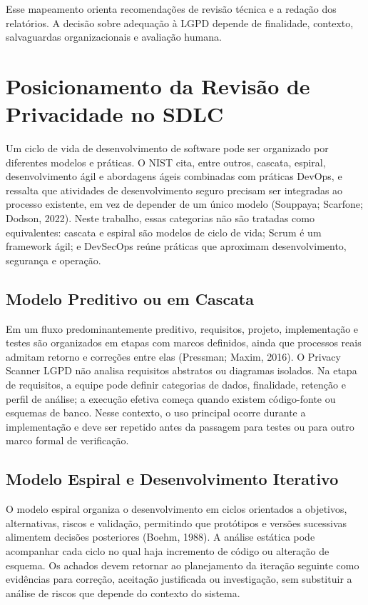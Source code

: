 \documentclass[12pt,a4paper,oneside]{report}
\begin{document}
Esse mapeamento orienta recomendações de revisão técnica e a redação dos relatórios. A decisão sobre adequação à LGPD depende de finalidade, contexto, salvaguardas organizacionais e avaliação humana.

\section{Posicionamento da Revisão de Privacidade no SDLC}

Um ciclo de vida de desenvolvimento de software pode ser organizado por diferentes modelos e práticas. O NIST cita, entre outros, cascata, espiral, desenvolvimento ágil e abordagens ágeis combinadas com práticas DevOps, e ressalta que atividades de desenvolvimento seguro precisam ser integradas ao processo existente, em vez de depender de um único modelo (Souppaya; Scarfone; Dodson, 2022). Neste trabalho, essas categorias não são tratadas como equivalentes: cascata e espiral são modelos de ciclo de vida; Scrum é um framework ágil; e DevSecOps reúne práticas que aproximam desenvolvimento, segurança e operação.

\subsection{Modelo Preditivo ou em Cascata}

Em um fluxo predominantemente preditivo, requisitos, projeto, implementação e testes são organizados em etapas com marcos definidos, ainda que processos reais admitam retorno e correções entre elas (Pressman; Maxim, 2016). O Privacy Scanner LGPD não analisa requisitos abstratos ou diagramas isolados. Na etapa de requisitos, a equipe pode definir categorias de dados, finalidade, retenção e perfil de análise; a execução efetiva começa quando existem código-fonte ou esquemas de banco. Nesse contexto, o uso principal ocorre durante a implementação e deve ser repetido antes da passagem para testes ou para outro marco formal de verificação.

\subsection{Modelo Espiral e Desenvolvimento Iterativo}

O modelo espiral organiza o desenvolvimento em ciclos orientados a objetivos, alternativas, riscos e validação, permitindo que protótipos e versões sucessivas alimentem decisões posteriores (Boehm, 1988). A análise estática pode acompanhar cada ciclo no qual haja incremento de código ou alteração de esquema. Os achados devem retornar ao planejamento da iteração seguinte como evidências para correção, aceitação justificada ou investigação, sem substituir a análise de riscos que depende do contexto do sistema.
\end{document}
